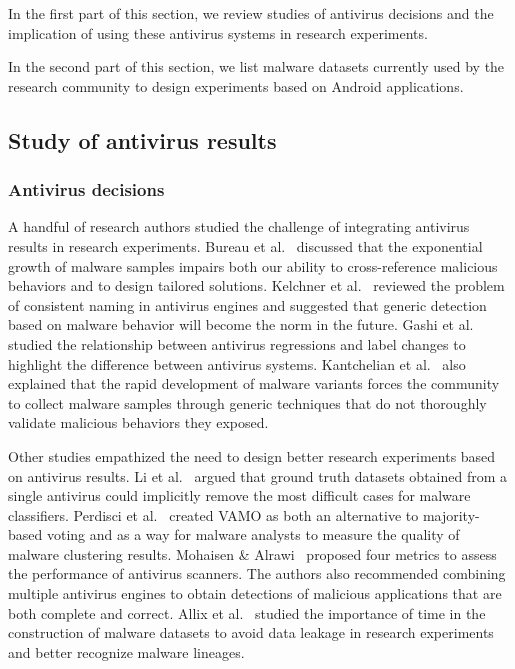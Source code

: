 In the first part of this section, we review studies of antivirus decisions and the implication of using these antivirus systems in research experiments.

In the second part of this section, we list malware datasets currently used by the research community to design experiments based on Android applications.
\subsection{Study of antivirus results}
\subsubsection{Antivirus decisions}
A handful of research authors studied the challenge of integrating antivirus results in research experiments.
Bureau et al.~\cite{bureau_dose_2008} discussed that the exponential growth of malware samples impairs both our ability to cross-reference malicious behaviors and to design tailored solutions.
Kelchner et al.~\cite{kelchner_consistent_2010} reviewed the problem of consistent naming in antivirus engines and suggested that generic detection based on malware behavior will become the norm in the future.
Gashi et al.~\cite{gashi_study_2013} studied the relationship between antivirus regressions and label changes to highlight the difference between antivirus systems.
Kantchelian et al.~\cite{kantchelian_better_2015} also explained that the rapid development of malware variants forces the community to collect malware samples through generic techniques that do not thoroughly validate malicious behaviors they exposed.

Other studies empathized the need to design better research experiments based on antivirus results.
Li et al.~\cite{li_challenges_2010} argued that ground truth datasets obtained from a single antivirus could implicitly remove the most difficult cases for malware classifiers.
Perdisci et al.~\cite{perdisci_vamo:_2012} created VAMO as both an alternative to majority-based voting and as a way for malware analysts to measure the quality of malware clustering results.
Mohaisen \& Alrawi~\cite{hutchison_av-meter:_2014} proposed four metrics to assess the performance of antivirus scanners.
The authors also recommended combining multiple antivirus engines to obtain detections of malicious applications that are both complete and correct.
Allix et al.~\cite{allix_machine_2014} studied the importance of time in the construction of malware datasets to avoid data leakage in research experiments and better recognize malware lineages.

